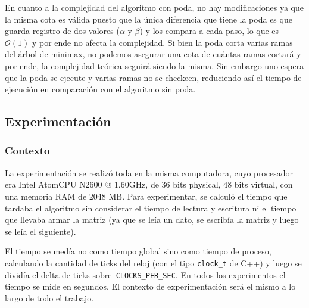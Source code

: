 \documentclass[A4paper,oneside,fleqn,11pt]{article}
\theoremstyle{definition}
\begin{document}
En cuanto a la complejidad del algoritmo con poda, no hay modificaciones ya que la misma cota es válida puesto que la única diferencia que tiene la poda es que guarda registro de dos valores ($\alpha$ y $\beta$) y los compara a cada paso, lo que es $\mathcal{O}(1)$ y por ende no afecta la complejidad. Si bien la poda corta varias ramas del árbol de minimax, no podemos asegurar una cota de cuántas ramas cortará y por ende, la complejidad teórica seguirá siendo la misma. Sin embargo uno espera que la poda se ejecute y varias ramas no se checkeen, reduciendo así el tiempo de ejecución en comparación con el algoritmo sin poda.



\subsection{Experimentación}

\subsubsection{Contexto} 


La experimentación se realizó toda en la misma computadora, cuyo procesador era Intel Atom\texttrademark CPU N2600 @ 1.60GHz, de 36 bits physical, 48 bits virtual, con una memoria RAM de 2048 MB.  Para experimentar, se calculó el tiempo que tardaba el algoritmo sin considerar el tiempo de lectura y escritura ni el tiempo que llevaba armar la matriz (ya que se leía un dato, se escribía la matriz y luego se leía el siguiente). 

El tiempo se medía no como tiempo global sino como tiempo de proceso, calculando la cantidad de ticks del reloj (con el tipo \texttt{clock\_t} de C++) y luego se dividía el delta de ticks sobre\texttt{ CLOCKS\_PER\_SEC}. En todos los experimentos el tiempo se mide en segundos. El contexto de experimentación será el mismo a lo largo de todo el trabajo.
\end{document}
